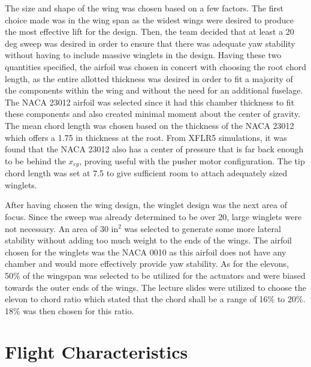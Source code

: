     The size and shape of the wing was chosen based on a few factors. The first choice made was in the wing span as the widest wings were desired to produce the most effective lift for the design. Then, the team decided that at least a 20 deg sweep was desired in order to ensure that there was adequate yaw stability without having to include massive winglets in the design. Having these two quantities specified, the airfoil was chosen in concert with choosing the root chord length, as the entire allotted thickness was desired in order to fit a majority of the components within the wing and without the need for an additional fuselage. The NACA 23012 airfoil was selected since it had this chamber thickness to fit these components and also created minimal moment about the center of gravity. The mean chord length was chosen based on the thickness of the NACA 23012 which offers a 1.75 in thickness at the root. From XFLR5 simulations, it was found that the NACA 23012 also has a center of pressure that is far back enough to be behind the $x_{cg}$, proving useful with the pusher motor configuration. The tip chord length was set at 7.5 to give sufficient room to attach adequately sized winglets. 

    After having chosen the wing design, the winglet design was the next area of focus. Since the sweep was already determined to be over 20\degree, large winglets were not necessary. An area of 30 in$^2$ was selected to generate some more lateral stability without adding too much weight to the ends of the wings. The airfoil chosen for the winglets was the NACA 0010 as this airfoil does not have any chamber and would more effectively provide yaw stability. As for the elevons, 50\% of the wingspan was selected to be utilized for the actuators and were biased towards the outer ends of the wings. The lecture slides were utilized to choose the elevon to chord ratio which stated that the chord shall be a range of 16\% to 20\%. 18\% was then chosen for this ratio.


\section{Flight Characteristics} \label{sec:flight_char}


